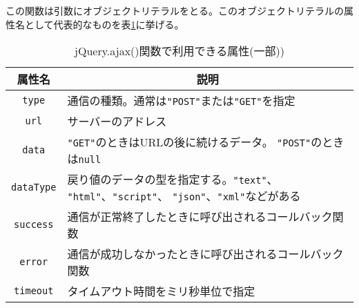 この関数は引数にオブジェクトリテラルをとる。このオブジェクトリテラルの属
性名として代表的なものを表\ref{jQueryAjax}に挙げる。
\begin{table}[ht]
 \caption{jQuery.ajax()関数で利用できる属性(一部))}\label{jQueryAjax}
\begin{center}
 \begin{tabular}{|c|m{}|}\hline
属性名  &\multicolumn{1}{c|}{説明} \\\hline
  \texttt{type}&通信の種類。通常は\texttt{"POST"}または\texttt{"GET"}を指定\\
  \hline
  \texttt{url}&サーバーのアドレス\\ \hline
  \texttt{data}&\texttt{"GET"}のときはURLの後に続けるデータ。
      \texttt{"POST"}のときは\texttt{null}\\ \hline
  \texttt{dataType}&戻り値のデータの型を指定する。\texttt{"text"}、
      \texttt{"html"}、\texttt{"script"}、      
\texttt{"json"}、\texttt{"xml"}などがある\\ \hline
\texttt{success}&通信が正常終了したときに呼び出されるコールバック関数
      \\ \hline
\texttt{error}&通信が成功しなかったときに呼び出されるコールバック関数
      \\ \hline
  \texttt{timeout}&タイムアウト時間をミリ秒単位で指定\\ \hline
 \end{tabular}
\end{center}
\end{table}
